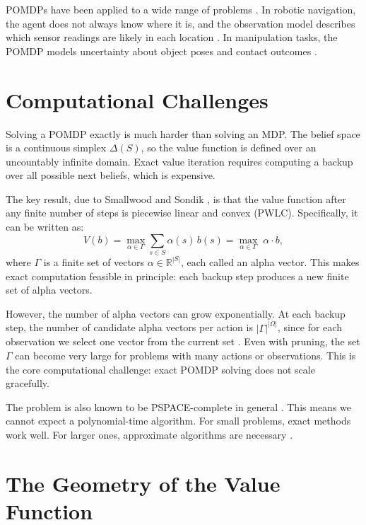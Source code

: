 POMDPs have been applied to a wide range of problems \cite{pomdpsMixedObservabilityRoboticTasks}.
In robotic navigation, the agent does not always know where it is, and the observation model describes which sensor readings are likely in each location \cite{kurniawatiPartiallyObservableMarkov2022}.
In manipulation tasks, the POMDP models uncertainty about object poses and contact outcomes \cite{pajarinenPOMDPPlanningObject2023}.


\section{Computational Challenges}
\label{sec:comp}

Solving a POMDP exactly is much harder than solving an MDP.
The belief space is a continuous simplex $\Delta(S)$, so the value function is defined over an uncountably infinite domain.
Exact value iteration requires computing a backup over all possible next beliefs, which is expensive.

The key result, due to Smallwood and Sondik \cite{smallwood1973optimal}, is that the value function after any finite number of steps is piecewise linear and convex (PWLC).
Specifically, it can be written as:
\begin{equation}
  V(b) = \max_{\alpha \in \Gamma} \sum_{s \in S} \alpha(s)\, b(s) = \max_{\alpha \in \Gamma}\; \alpha \cdot b,
\end{equation}
where $\Gamma$ is a finite set of vectors $\alpha \in \mathbb{R}^{|S|}$, each called an alpha vector.
This makes exact computation feasible in principle: each backup step produces a new finite set of alpha vectors.

However, the number of alpha vectors can grow exponentially.
At each backup step, the number of candidate alpha vectors per action is $|\Gamma|^{|\Omega|}$, since for each observation we select one vector from the current set \cite{cassandra1994acting}.
Even with pruning, the set $\Gamma$ can become very large for problems with many actions or observations.
This is the core computational challenge: exact POMDP solving does not scale gracefully.

The problem is also known to be PSPACE-complete in general \cite{cassandra1994acting}.
This means we cannot expect a polynomial-time algorithm.
For small problems, exact methods work well.
For larger ones, approximate algorithms are necessary \cite{hauskrechtValuefunctionApproximationsPartially2000}.


\section{The Geometry of the Value Function}
\label{sec:pwlc}

